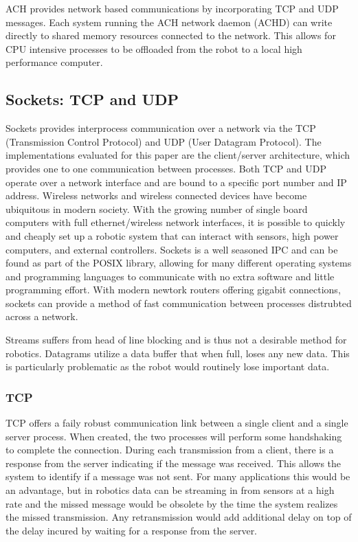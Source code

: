 ACH provides network based communications by incorporating TCP and UDP messages. Each system running the ACH network daemon (ACHD) can write directly to shared memory resources connected to the network\cite{ACHHUBO}. This allows for CPU intensive processes to be offloaded from the robot to a local high performance computer. 

\subsection{Sockets: TCP and UDP}

Sockets provides interprocess communication over a network via the TCP (Transmission Control Protocol) and UDP (User Datagram Protocol). The implementations evaluated for this paper are the client/server  architecture, which provides one to one communication between processes. Both TCP and UDP operate over a network interface and are bound to a specific port number and IP address. Wireless networks and wireless connected devices have become ubiquitous in modern society. With the growing number of single board computers with full ethernet/wireless network interfaces, it is possible to quickly and cheaply set up a robotic system that can interact with sensors, high power computers, and external controllers. Sockets is a well seasoned IPC and can be found as part of the POSIX library, allowing for many different operating systems and programming languages to communicate with no extra software and little programming effort. With modern newtork routers offering gigabit connections, sockets can provide a method of fast communication between processes distrubted across a network. 

Streams suffers from head of line blocking and is thus not a desirable method for robotics. Datagrams utilize a data buffer that when full, loses any new data. This is particularly problematic as the robot would routinely lose important data. 

\subsubsection{TCP}

TCP offers a faily robust communication link between a single client and a single server process. When created, the two processes will perform some handshaking to complete the connection. During each transmission from a client, there is a response from the server indicating if the message was received. This allows the system to identify if a message was not sent. For many applications this would be an advantage, but in robotics data can be streaming in from sensors at a high rate and the missed message would be obsolete by the time the system realizes the missed transmission\cite{UDPTCP}. Any retransmission would add additional delay on top of the delay incured by waiting for a response from the server.

